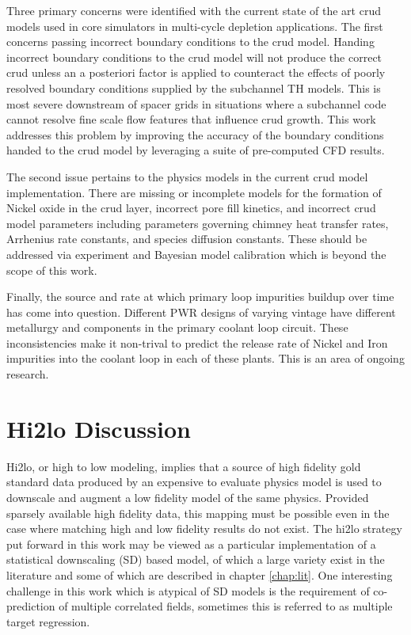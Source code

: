 Three primary concerns were identified with the current state of the art crud models used in core simulators in multi-cycle depletion applications.
The first concerns passing incorrect boundary conditions to the crud model.  Handing incorrect boundary conditions to the crud model will not produce the correct crud unless an a posteriori factor is applied to counteract the effects of poorly resolved boundary conditions supplied by the subchannel TH models.  This is most severe downstream of spacer grids in situations where a subchannel code cannot resolve fine scale flow features that influence crud growth.  This work  addresses this problem by improving the accuracy of the boundary conditions handed to the crud model by leveraging a suite of pre-computed CFD results.

The second issue pertains to the physics models in the current crud model implementation.  There are missing or incomplete models for the formation of Nickel oxide in the crud layer, incorrect pore fill kinetics, and incorrect crud model parameters including parameters governing chimney heat transfer rates, Arrhenius rate constants, and species diffusion constants. These should be addressed via experiment and Bayesian model calibration which is beyond the scope of this work.

Finally, the source and rate at which primary loop impurities buildup over time has come into question.  Different PWR designs of varying vintage have different metallurgy and components in the primary coolant loop circuit.  These inconsistencies make it non-trival to predict the release rate of Nickel and Iron impurities into the coolant loop in each of these plants.  This is an area of ongoing research.



\section{Hi2lo Discussion}

Hi2lo, or high to low modeling, implies that a source of high fidelity gold standard data produced by an expensive to evaluate physics model is used to downscale and augment a low fidelity model of the same physics.
Provided sparsely available high fidelity data, this mapping must be possible even in the case where matching high and low fidelity results do not exist.  The hi2lo strategy put forward in this work may be viewed as a particular implementation of a statistical downscaling (SD) based model, of which a large variety exist in the literature and some of which are described in chapter \ref{chap:lit}.  One interesting challenge in this work which is atypical of SD models is the requirement of co-prediction of multiple correlated fields, sometimes this is referred to as multiple target regression.

